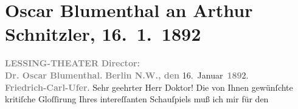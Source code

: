 

         
         \renewcommand{\erwaehntePersonen}{Personen: Oskar Blumenthal, Emanuel Reicher}
         \renewcommand{\erwaehnteInstitutionen}{Institutionen: Emanuel Reicher’s Deutsche Gastspielgesellschaft, Lessing-Theater}
         \renewcommand{\erwaehnteOrte}{Orte: Alexanderstraße, Berlin, Kapelle-Ufer, Wien}
         \renewcommand{\erwaehnteWerke}{Werke: Das Märchen. Schauspiel in drei Aufzügen, Tagebuch}
               \section[Oscar Blumenthal an Arthur Schnitzler, 16. 1. 1892]{ Oscar Blumenthal an Arthur Schnitzler, 16. 1. 1892}\nopagebreak{}\rehead{ }\begin{ledgroupsized}[t]{13cm}\normalsize\beginnumbering \toendnotes[C]{\smallbreak\pagebreak[2]} 
\toendnotes[C]{\smallbreak}\pstart
           \noindent{}\centering{}{\pb}\textcolor{gray}{\textbf{LESSING-THEATER}}\pend
           \pstart
           \noindent{}\centering{}\textcolor{gray}{\textbf{Director:}}{\\}\textcolor{gray}{\textbf{Dr. Oscar Blumenthal.}}\pend
           \pstart
           \noindent{}\raggedleft{}\textcolor{gray}{\textbf{Berlin N.W., den}}{ }16. Januar \textcolor{gray}{\textbf{189}}2.{\\}\textcolor{gray}{\textbf{Friedrich-Carl-Ufer}}.\pend
           \pstart\center{}Sehr geehrter Herr Doktor!\pend\pstart
           Die von Ihnen gewünſchte kritiſche Gloſſirung Ihres intereſſanten Schauſpiels muß ich mir für den

\end{ledgroupsized}

